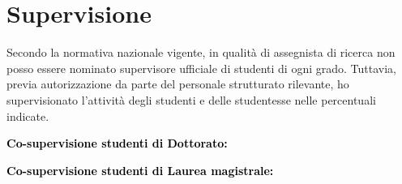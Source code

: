 \vspace{-0.1cm}

\section{Supervisione}
Secondo la normativa nazionale vigente, in qualità di assegnista di ricerca non posso essere nominato supervisore ufficiale di studenti di ogni grado. Tuttavia, previa autorizzazione da parte del personale strutturato rilevante, ho supervisionato l'attività degli studenti e delle studentesse nelle percentuali indicate.

\vspace{0.2cm}
\textbf{\textcolor{black}{Co-supervisione studenti di Dottorato:}}
\vspace{0.1cm}
\\
%
\vspace{-0.1cm}
%
\vspace{-0.1cm}
%
\vspace{-0.1cm}

\vspace{0.2cm}
\textbf{\textcolor{black}{Co-supervisione studenti di Laurea magistrale:}}
\vspace{0.1cm}

